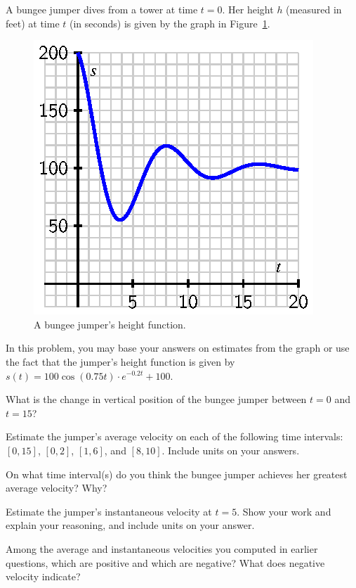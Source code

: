 \begin{exercises} 

\item \label{Ez:1.1.1} A bungee jumper dives from a tower at time $t=0$.   Her height $h$ (measured in feet) at time $t$ (in seconds) is given by the graph in Figure~\ref{F:1.1.Ez1}.

\begin{figure}[h]
\begin{center}
 \includegraphics{figures/1_1_Ez1.eps}
 \caption{A bungee jumper's height function.} \label{F:1.1.Ez1}
\end{center}
\end{figure}

In this problem, you may base your answers on estimates from the graph or use the fact that the jumper's height function is given by $s(t) = 100\cos(0.75t) \cdot e^{-0.2t}+100$.
  \ba
	\item What is the change in vertical position of the bungee jumper between $t=0$ and $t=15$?
	\item Estimate the jumper's average velocity on each of the following time intervals:  $[0,15]$, $[0,2]$, $[1,6]$, and $[8,10]$.  Include units on your answers.
	\item On what time interval(s) do you think the bungee jumper achieves her greatest average velocity?  Why? 
	\item Estimate the jumper's instantaneous velocity at $t=5$.  Show your work and explain your reasoning, and include units on your answer.
	\item Among the average and instantaneous velocities you computed in earlier questions, which are positive and which are negative?  What does negative velocity indicate?
  \ea 


\end{exercises}
